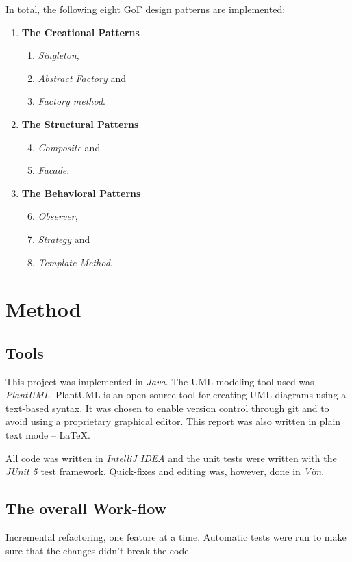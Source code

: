 \documentclass[a4paper]{scrreprt}
\begin{document}
In total, the following eight GoF design patterns are implemented:
\begin{enumerate}
    \item \textbf{The Creational Patterns}
    \begin{enumerate}
        \item \emph{Singleton},
        \item \emph{Abstract Factory} and
        \item \emph{Factory method}.
    \end{enumerate}
    \item \textbf{The Structural Patterns}
    \begin{enumerate}
        \setcounter{enumi}{3}
        \item \emph{Composite} and
        \item \emph{Facade}.
    \end{enumerate}
    \item \textbf{The Behavioral Patterns}
    \begin{enumerate}
        \setcounter{enumi}{5}
        \item \emph{Observer},
        \item \emph{Strategy} and
        \item \emph{Template Method}.
    \end{enumerate}
\end{enumerate}

\chapter{Method}
\section*{Tools}
This project was implemented in \emph{Java}.
The UML modeling tool used was \emph{PlantUML}.
PlantUML is an open-source tool for creating UML diagrams using a text-based
syntax.
It was chosen to enable version control through git and to avoid using a
proprietary graphical editor.
This report was also written in plain text mode -- \LaTeX.

All code was written in \emph{IntelliJ IDEA} and the unit tests were written with the \emph{JUnit 5} test framework.
Quick-fixes and editing was, however, done in \emph{Vim}.

\section*{The overall Work-flow}
Incremental refactoring, one feature at a time.
Automatic tests were run to make sure that the changes didn't break the code.
\end{document}
